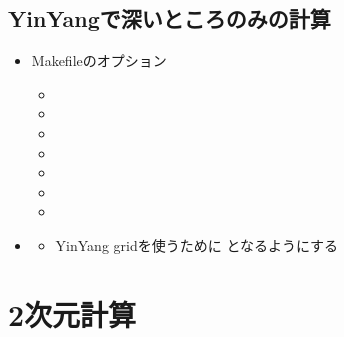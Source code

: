 \documentclass[letterpaper,10pt,dvipdfmx,report]{sphinxmanual}
\begin{document}
\subsection{Yin\sphinxhyphen{}Yangで深いところのみの計算}
\label{\detokenize{typical_case:id12}}\begin{itemize}
\item {} 
\sphinxAtStartPar
Makefileのオプション
\begin{itemize}
\item {} 
\sphinxAtStartPar
{}

\item {} 
\sphinxAtStartPar
{}

\item {} 
\sphinxAtStartPar
{}

\item {} 
\sphinxAtStartPar
{}

\item {} 
\sphinxAtStartPar
{}

\item {} 
\sphinxAtStartPar
{}

\item {} 
\sphinxAtStartPar
{}

\end{itemize}

\item {} \begin{description}
\begin{itemize}
\item {} 
\sphinxAtStartPar
Yin\sphinxhyphen{}Yang gridを使うために  となるようにする

\end{itemize}

\end{description}

\end{itemize}


\section{2次元計算}
\label{\detokenize{typical_case:id13}}
\end{document}
